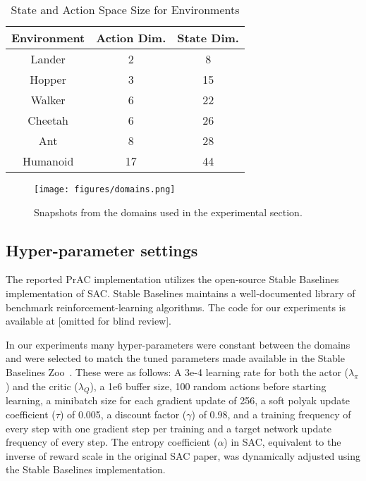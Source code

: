\documentclass[letterpaper]{article} %
\begin{document}
            \begin{center}
                \begin{table}
                    \centering
                    \caption{State and Action Space Size for Environments}
                    \begin{tabular}{ | c c c | }
                        \hline
                        Environment & Action Dim. & State Dim. \\
                        \hline
                        Lander & 2 & 8 \\ 
                        Hopper & 3 & 15 \\  
                        Walker & 6 & 22 \\    
                        Cheetah & 6 & 26 \\  
                        Ant & 8 & 28 \\  
                        Humanoid & 17 & 44 \\
                        \hline
                    \end{tabular}
                    \label{table:state-action-dim}
                \end{table}
            \end{center}


            \begin{figure}
                \texttt{[image: figures/domains.png]}
                \caption{Snapshots from the domains used in the experimental section.}
                \label{domains}
            \end{figure}

        \subsection{Hyper-parameter settings}

            The reported PrAC implementation utilizes the open-source Stable Baselines~\cite{stable-baselines} implementation of SAC. Stable Baselines maintains a well-documented library of benchmark reinforcement-learning algorithms. The code for our experiments is available at [omitted for blind review].

            In our experiments many hyper-parameters were constant between the domains and were selected to match the tuned parameters made available in the Stable Baselines Zoo~\cite{rl-zoo3}. These were as follows: A 3e-4 learning rate for both the actor ($\lambda_\pi$) and the critic ($\lambda_Q$), a 1e6 buffer size, 100 random actions before starting learning, a minibatch size for each gradient update of 256, a soft polyak update coefficient ($\tau$) of 0.005, a discount factor ($\gamma$) of 0.98, and a training frequency of every step with one gradient step per training and a target network update frequency of every step.
            The entropy coefficient ($\alpha$) in SAC, equivalent to the inverse of reward scale in the original SAC paper, was dynamically adjusted using the Stable Baselines implementation.
\end{document}
